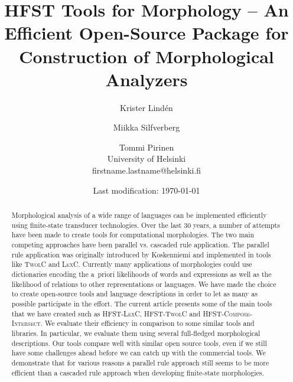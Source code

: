 \documentclass[postprint]{flammie}
\begin{document}
\ifpdf
{}
\fi
\title{\textsc{HFST} Tools for Morphology -- An Efficient Open-Source
Package for Construction of Morphological Analyzers
}

\author{ Krister Lindén \and Miikka Silfverberg \and Tommi Pirinen \\
University of Helsinki\\
            firstname.lastname@helsinki.fi\\
            }

\date{Last modification: \today}

\maketitle

\begin{abstract}
Morphological analysis of a wide range of languages can be implemented
efficiently using finite-state transducer technologies. Over the last
30 years, a number of attempts have been made to create tools for
computational morphologies. The two main competing approaches have
been parallel vs. cascaded rule application. The parallel rule
application was originally introduced by Koskenniemi
\cite{Koskenniemi83} and implemented in tools like \textsc{TwolC} and
\textsc{LexC}. Currently many applications of morphologies could use
dictionaries encoding the a~priori likelihoods of words and
expressions as well as the likelihood of relations to other
representations or languages. We have made the choice to create
open-source tools and language descriptions in order to let as many as
possible participate in the effort. The current article presents some
of the main tools that we have created such as \textsc{HFST-LexC},
\textsc{HFST-TwolC} and \textsc{HFST-Compose-Intersect}.  We evaluate
their efficiency in comparison to some similar tools and libraries. In
particular, we evaluate them using several full-fledged morphological
descriptions. Our tools compare well with similar open source tools,
even if we still have some challenges ahead before we can catch up
with the commercial tools. We demonstrate that for various reasons a
parallel rule approach still seems to be more efficient than a
cascaded rule approach when developing finite-state morphologies.
\end{abstract}
\end{document}
